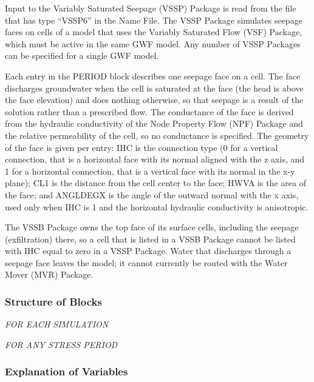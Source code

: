 Input to the Variably Saturated Seepage (VSSP) Package is read from the file that has type ``VSSP6'' in the Name File.  The VSSP Package simulates seepage faces on cells of a model that uses the Variably Saturated Flow (VSF) Package, which must be active in the same GWF model.  Any number of VSSP Packages can be specified for a single GWF model.

Each entry in the PERIOD block describes one seepage face on a cell.  The face discharges groundwater when the cell is saturated at the face (the head is above the face elevation) and does nothing otherwise, so that seepage is a result of the solution rather than a prescribed flow.  The conductance of the face is derived from the hydraulic conductivity of the Node Property Flow (NPF) Package and the relative permeability of the cell, so no conductance is specified.  The geometry of the face is given per entry: IHC is the connection type (0 for a vertical connection, that is a horizontal face with its normal aligned with the z axis, and 1 for a horizontal connection, that is a vertical face with its normal in the x-y plane); CL1 is the distance from the cell center to the face; HWVA is the area of the face; and ANGLDEGX is the angle of the outward normal with the x axis, used only when IHC is 1 and the horizontal hydraulic conductivity is anisotropic.

The VSSB Package owns the top face of its surface cells, including the seepage (exfiltration) there, so a cell that is listed in a VSSB Package cannot be listed with IHC equal to zero in a VSSP Package.  Water that discharges through a seepage face leaves the model; it cannot currently be routed with the Water Mover (MVR) Package.

\vspace{5mm}
\subsubsection{Structure of Blocks}
\vspace{5mm}

\noindent \textit{FOR EACH SIMULATION}



\vspace{5mm}
\noindent \textit{FOR ANY STRESS PERIOD}


\vspace{5mm}
\subsubsection{Explanation of Variables}
\begin{description}

\end{description}
